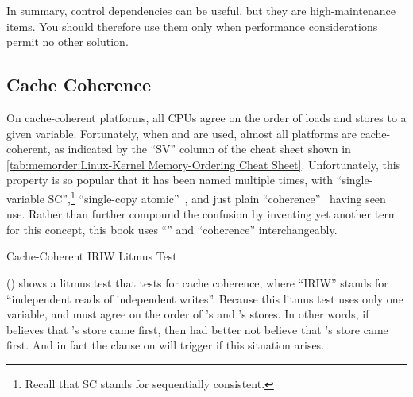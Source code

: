 In summary, control dependencies can be useful, but they are
high-maintenance items.
You should therefore use them only when performance considerations
permit no other solution.

\QuickQuizEnd

\subsection{Cache Coherence}
\label{sec:memorder:Cache Coherence}

On cache-coherent platforms, all CPUs agree on the order of loads and
stores to a given variable.
Fortunately, when  and  are used,
almost all platforms are cache-coherent, as indicated by the ``SV''
column of the cheat sheet shown in
\cref{tab:memorder:Linux-Kernel Memory-Ordering Cheat Sheet}.
Unfortunately, this property is so popular that it has been named
multiple times, with ``single-variable SC'',\footnote{
	Recall that SC stands for sequentially consistent.}
``single-copy atomic''~\cite{Stone:1995:SP:623262.623912},
and just plain ``coherence''~\cite{JadeAlglave2011ppcmem}
having seen use.
Rather than further compound the confusion by inventing yet another term
for this concept, this book uses ``'' and ``coherence''
interchangeably.

\begin{listing}

\caption{Cache-Coherent IRIW Litmus Test}
\label{lst:memorder:Cache-Coherent IRIW Litmus Test}
\end{listing}

\begin{fcvref}
()
shows a litmus test that tests for cache coherence,
where ``IRIW'' stands
for ``independent reads of independent writes''.
Because this litmus test uses only one variable,
 and  must agree
on the order of 's and 's stores.
In other words, if  believes that 's store
came first, then  had better not believe that
's store came first.
And in fact the  clause on  will trigger if this
situation arises.
\end{fcvref}


